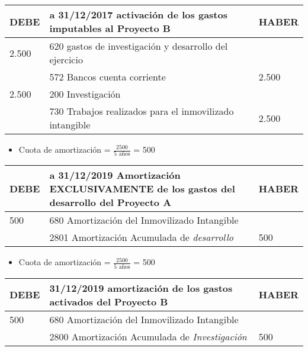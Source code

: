 \documentclass[a4paper,12pt]{article}
\newcommand{\fec}{31/12/}
\newcommand{\bancos}{572 Bancos cuenta corriente}
\newcommand{\cuotaamort}{Cuota de amortización = }
\newcommand{\myequation}[2]{\ensuremath{\frac{#1}{#2}}}
\begin{document}
\begin{table}[H]
    \centering
    \begin{tabular}{|p{3cm}|p{6cm}|p{3cm}|}
    \hline
    \textbf{DEBE} & \textbf{a \fec2017 activación de los gastos imputables al Proyecto B} & \textbf{HABER} \\
    \hline
    2.500 & 620 gastos de investigación y desarrollo del ejercicio& \\
    \hline
    & \bancos & 2.500\\
    \hline
    2.500& 200 Investigación& \\
    \hline
    & 730 Trabajos realizados para el inmovilizado intangible&  2.500\\
    \hline
    \end{tabular}
\end{table}

\begin{itemize}
    \item \cuotaamort \myequation{2500}{5 \text{ años}} = 500
\end{itemize}

\begin{table}[H]
    \centering
    \begin{tabular}{|p{3cm}|p{6cm}|p{3cm}|}
    \hline
    \textbf{DEBE} & \textbf{a \fec2019 Amortización EXCLUSIVAMENTE de los gastos del desarrollo del Proyecto A} & \textbf{HABER} \\
    \hline
    500 & 680 Amortización del Inmovilizado Intangible& \\
    \hline
    & 2801 Amortización Acumulada de \textit{desarrollo}& 500\\
    \hline
    \end{tabular}
\end{table}

\begin{itemize}
    \item \cuotaamort \myequation{2500}{5 \text{ años}} = 500
\end{itemize}

\begin{table}[H]
    \centering
    \begin{tabular}{|p{3cm}|p{6cm}|p{3cm}|}
    \hline
    \textbf{DEBE} & \textbf{\fec2019 amortización de los gastos activados del Proyecto B} & \textbf{HABER} \\
    \hline
    500 & 680 Amortización del Inmovilizado Intangible& \\
    \hline
    & 2800 Amortización Acumulada de \textit{Investigación}& 500\\
    \hline
    \end{tabular}
\end{table}
\end{document}
